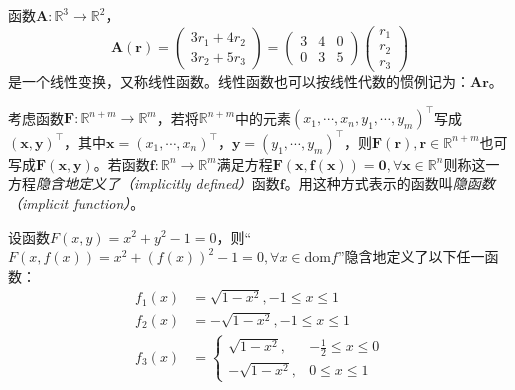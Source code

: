 \documentclass[main.tex]{subfiles}
\begin{document}
\begin{example}
    函数$\mathbf{A}:\mathbb{R}^3\rightarrow\mathbb{R}^2$，
    \[\mathbf{A}\left(\mathbf{r}\right)=\left(\begin{array}{c}3r_1+4r_2\\3r_2+5r_3\end{array}\right)=\left(\begin{array}{ccc}3&4&0\\0&3&5\end{array}\right)\left(\begin{array}{c}r_1\\r_2\\r_3\end{array}\right)\]
    是一个线性变换，又称线性函数。线性函数也可以按线性代数的惯例记为：$\mathbf{Ar}$。
\end{example}

\begin{definition}[隐函数]\label{def:II.4.2}
    考虑函数$\mathbf{F}:\mathbb{R}^{n+m}\rightarrow\mathbb{R}^m$，若将$\mathbb{R}^{n+m}$中的元素$\left(x_1,\cdots,x_n,y_1,\cdots,y_m\right)^\intercal$写成$\left(\mathbf{x},\mathbf{y}\right)^\intercal$，其中$\mathbf{x}=\left(x_1,\cdots,x_n\right)^\intercal$，$\mathbf{y}=\left(y_1,\cdots,y_m\right)^\intercal$，则$\mathbf{F}\left(\mathbf{r}\right),\mathbf{r}\in\mathbb{R}^{n+m}$也可写成$\mathbf{F}\left(\mathbf{x},\mathbf{y}\right)$。若函数$\mathbf{f}:\mathbb{R}^n\rightarrow\mathbb{R}^m$满足方程$\mathbf{F}\left(\mathbf{x},\mathbf{f}\left(\mathbf{x}\right)\right)=\mathbf{0},\forall\mathbf{x}\in\mathbb{R}^n$则称这一方程\emph{隐含地定义了（implicitly defined）}函数$\mathbf{f}$。用这种方式表示的函数叫\emph{隐函数（implicit function）}。
\end{definition}

\begin{example}
    设函数$F\left(x,y\right)=x^2+y^2-1=0$，则“$F\left(x,f\left(x\right)\right)=x^2+\left(f\left(x\right)\right)^2-1=0,\forall x\in\mathrm{dom}f$”隐含地定义了以下任一函数：
    \begin{align*}
        f_1\left(x\right) & =\sqrt{1-x^2},-1\leq x\leq 1                      \\
        f_2\left(x\right) & =-\sqrt{1-x^2},-1\leq x\leq 1                     \\
        f_3\left(x\right) & =\left\{\begin{array}{ll}
                                        \sqrt{1-x^2},  & -\frac{1}{2}\leq x\leq 0 \\
                                        -\sqrt{1-x^2}, & 0\leq x\leq 1
                                    \end{array}\right.
    \end{align*}
\end{example}
\end{document}
